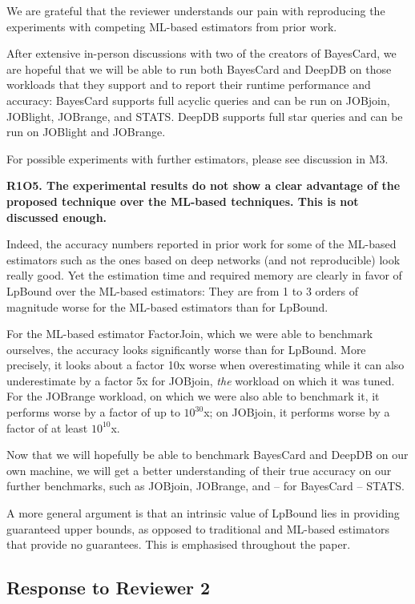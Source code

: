 {
\color{blue}
We are grateful that the reviewer understands our pain with reproducing the experiments with competing ML-based estimators from prior work. 

After extensive in-person discussions with two of the  creators of BayesCard, we are hopeful that we will be able to run both BayesCard and DeepDB on those workloads that they support and to report their runtime performance and accuracy: BayesCard supports full acyclic queries and can be run on JOBjoin, JOBlight, JOBrange, and STATS. DeepDB supports full star queries and can be run on JOBlight and JOBrange. 

For possible experiments with further estimators, please see discussion in M3.  
}

\vspace{0.5em}\noindent
\textbf{
R1O5. The experimental results do not show a clear advantage of the proposed technique over the ML-based techniques. This is not discussed enough. 
}

{
\color{blue}
Indeed, the accuracy numbers reported in prior work for some of the ML-based estimators such as the ones based on deep networks (and not reproducible) look really good. Yet the estimation time and required memory are clearly in favor of LpBound over the ML-based estimators: They are from 1 to 3 orders of magnitude worse for the ML-based estimators than for LpBound. 

For the ML-based estimator FactorJoin, which we were able to benchmark ourselves, the accuracy looks significantly worse than for LpBound. More precisely, it looks about a factor 10x worse when overestimating while it can also underestimate by a factor 5x for JOBjoin, {\em the} workload on which it was tuned. For the JOBrange workload, on which we were also able to benchmark it, it performs worse by a factor of up to $10^{30}$x; on JOBjoin, it performs worse by a factor of at least $10^{10}$x.

Now that we will hopefully be able to benchmark BayesCard and DeepDB on our own machine, we will get a better understanding of their true accuracy on our further benchmarks, such as JOBjoin, JOBrange, and -- for BayesCard -- STATS.

A more general argument is that an intrinsic value of LpBound lies in providing guaranteed upper bounds, as opposed to traditional and ML-based estimators that provide no guarantees. This is emphasised throughout the paper.
}


\subsection*{Response to Reviewer 2} 

